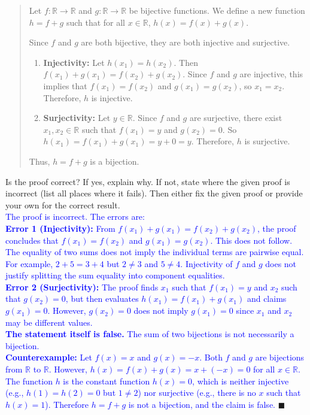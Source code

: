 \documentclass{article}
\begin{document}
\begin{quote}
Let $f: \mathbb{R} \rightarrow \mathbb{R}$ and $g: \mathbb{R} \rightarrow \mathbb{R}$ be bijective functions. We define a new function $h = f + g$ such that for all $x \in \mathbb{R}$, $h(x) = f(x) + g(x)$.

Since $f$ and $g$ are both bijective, they are both injective and surjective.

\begin{enumerate}
\item \textbf{Injectivity:} Let $h(x_1) = h(x_2)$. Then $f(x_1) + g(x_1) = f(x_2) + g(x_2)$. Since $f$ and $g$ are injective, this implies that $f(x_1) = f(x_2)$ and $g(x_1) = g(x_2)$, so $x_1 = x_2$. Therefore, $h$ is injective.
\item \textbf{Surjectivity:} Let $y \in \mathbb{R}$. Since $f$ and $g$ are surjective, there exist $x_1, x_2 \in \mathbb{R}$ such that $f(x_1) = y$ and $g(x_2) = 0$. So $h(x_1) = f(x_1) + g(x_1) = y + 0 = y$. Therefore, $h$ is surjective.
\end{enumerate}

Thus, $h = f + g$ is a bijection.
\end{quote}

Is the proof correct? If yes, explain why. If not, state where the given proof is incorrect (list all places where it fails). Then either fix the given proof or provide your own for the correct result. \\[1em]
\textcolor{blue}{The proof is incorrect. The errors are:} \\[0.5em]
\textcolor{blue}{\textbf{Error 1 (Injectivity):} From $f(x_1) + g(x_1) = f(x_2) + g(x_2)$, the proof concludes that $f(x_1) = f(x_2)$ and $g(x_1) = g(x_2)$. This does not follow. The equality of two sums does not imply the individual terms are pairwise equal. For example, $2 + 5 = 3 + 4$ but $2 \neq 3$ and $5 \neq 4$. Injectivity of $f$ and $g$ does not justify splitting the sum equality into component equalities.} \\[0.5em]
\textcolor{blue}{\textbf{Error 2 (Surjectivity):} The proof finds $x_1$ such that $f(x_1) = y$ and $x_2$ such that $g(x_2) = 0$, but then evaluates $h(x_1) = f(x_1) + g(x_1)$ and claims $g(x_1) = 0$. However, $g(x_2) = 0$ does not imply $g(x_1) = 0$ since $x_1$ and $x_2$ may be different values.} \\[0.5em]
\textcolor{blue}{\textbf{The statement itself is false.} The sum of two bijections is not necessarily a bijection.} \\[0.5em]
\textcolor{blue}{\textbf{Counterexample:} Let $f(x) = x$ and $g(x) = -x$. Both $f$ and $g$ are bijections from $\mathbb{R}$ to $\mathbb{R}$. However, $h(x) = f(x) + g(x) = x + (-x) = 0$ for all $x \in \mathbb{R}$. The function $h$ is the constant function $h(x) = 0$, which is neither injective (e.g., $h(1) = h(2) = 0$ but $1 \neq 2$) nor surjective (e.g., there is no $x$ such that $h(x) = 1$). Therefore $h = f + g$ is not a bijection, and the claim is false.} $\blacksquare$
\end{document}
